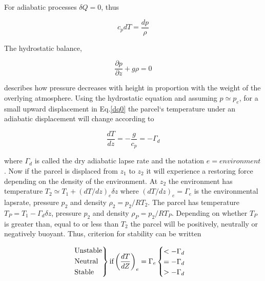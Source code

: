 For adiabatic processes $\delta Q = 0$, thus

\begin{equation}
    c_pdT = \frac{dp}{\rho}
    \label{dq0}
\end{equation}

The hydrostatic balance,

\begin{equation}
    \frac{\partial p}{\partial z} +g\rho = 0
\end{equation}

describes how pressure decreases with height in proportion with the weight of the overlying atmosphere. Using the hydrostatic equation and assuming $p \simeq p_{e}$, for a small upward displacement in Eq.\eqref{dq0} the parcel`s temperature under an adiabatic displacement will change according to

\begin{equation}
    \frac{dT}{dz} = -\frac{g}{c_p} = - \Gamma_d
    \label{drylaps}
\end{equation}

where $\Gamma_d$ is called the dry adiabatic lapse rate and the notation $e = environment$. Now if the parcel is displaced from $z_1$ to $z_2$ it will experience a restoring force depending on the density of the environment. At $z_2$ the environment has temperature $T_2 \simeq T_1 + (dT/dz)_e \delta z$ where $(dT/dz)_e = \Gamma_e$ is the environmental lapsrate, pressure $p_2$ and density $\rho_2 = p_2/RT_2$. The parcel has temperature $T_P = T_1 - \Gamma_d\delta z$, pressure $p_2$ and density $\rho_P = p_2/RT_P$. Depending on whether $T_P$ is greater than, equal to or less than $T_2$ the parcel will be positively, neutrally or negatively buoyant. Thus, criterion for stability can be written

\begin{equation}
    \begin{rcases}
      \text{Unstable}\\
      \text{Neutral}\\
      \text{Stable}
    \end{rcases}   
    \text{if} \left(\frac{dT}{dZ}\right)_e = \Gamma_e 
    \begin{cases}
      < - \Gamma_d \\
      = - \Gamma_d \\
      > - \Gamma_d
    \end{cases}
    \label{stabcond}
\end{equation}

